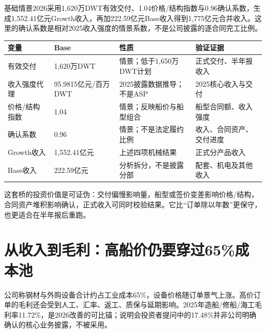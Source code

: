 基础情景2026采用1,620万DWT有效交付、1.04价格/结构指数与0.96确认系数，生成1,552.41亿元Growth收入，再加222.59亿元Base收入得到1,775亿元合并收入。这里的确认系数是相对2025收入强度的情景系数，不是公司披露的逐合同完工比例。

\begin{exhibitbox}[2026收入桥的披露与推导边界]
\small
\begin{tabularx}{\exhibitboxwidth}{L{3.4cm}R{2.4cm}L{4.0cm}X}
\toprule
\textbf{变量} & \textbf{Base} & \textbf{性质} & \textbf{验证证据} \\
\midrule
有效交付 & 1,620万DWT & 情景；低于1,650万DWT计划 & 正式交付、半年报收入 \\
收入强度代理 & 95.9815亿元/百万DWT & 2025披露数据推导；不是ASP & 2025核心收入与交付 \\
价格/结构指数 & 1.04 & 情景；反映船价与船型组合 & 船型合同额、收入强度 \\
确认系数 & 0.96 & 情景；不是法定履约比例 & 收入、合同资产、交付进度 \\
Growth收入 & 1,552.41亿元 & 上述四项机械结果 & 正式分产品收入 \\
Base收入 & 222.59亿元 & 分析拆分，不是披露分部 & 配套、机电及其他收入 \\
\bottomrule
\end{tabularx}
\end{exhibitbox}

这套桥的投资价值是可证伪：交付偏慢影响量，船型或签价变差影响价格/结构，合同资产堆积影响确认，正式收入可同时校验结果。它比“订单除以年数”更保守，也更适合在半年报后重跑。

\section{从收入到毛利：高船价仍要穿过65\%成本池}

公司称钢材与外购设备合计约占工业成本65\%，设备价格随订单景气上涨。高价订单的毛利还会受到人工、汇率、返工、质保与延期影响。2025年造船/修船/海工毛利率11.72\%，是2026改善的可比锚；说明会投资者提问中的17.48\%并非公司明确确认的核心业务披露，不被采用。


